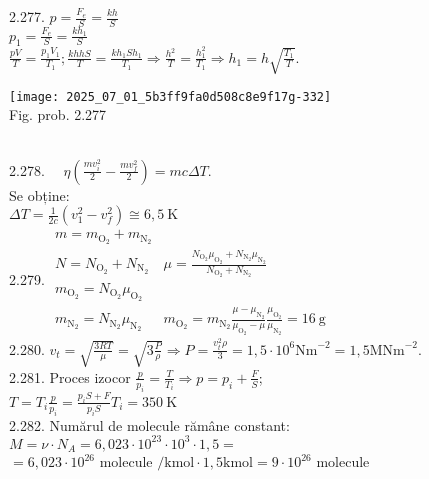 2.277. $p=\frac{F_{e}}{S}=\frac{k h}{S}$\\ $p_{1}=\frac{F_{e}}{S}=\frac{k h_{1}}{S}$\\ $\frac{p V}{T}=\frac{p_{1} V_{1}}{T_{1}} ; \frac{k h h S}{T}=\frac{k h_{1} S h_{1}}{T_{1}} \Rightarrow \frac{h^{2}}{T}=\frac{h_{1}^{2}}{T_{1}} \Rightarrow h_{1}=h \sqrt{\frac{T_{1}}{T}} .$\\ \begin{center} \texttt{[image: 2025\_07\_01\_5b3ff9fa0d508c8e9f17g-332]}\\ Fig. prob. 2.277 \end{center}\\

2.278. $\quad \eta\left(\frac{m v_{i}^{2}}{2}-\frac{m v_{f}^{2}}{2}\right)=m c \Delta T$.\\ Se obține:\\ $\Delta T=\frac{1}{2 c}\left(v_{1}^{2}-v_{f}^{2}\right) \cong 6,5 \mathrm{~K}$\\

2.279. $\begin{array}{ll} m=m_{\mathrm{O}_{2}}+m_{\mathrm{N}_{2}}\\ N=N_{\mathrm{O}_{2}}+N_{\mathrm{N}_{2}} & \mu=\frac{N_{\mathrm{O}_{2}} \mu_{\mathrm{O}_{2}}+N_{\mathrm{N}_{2}} \mu_{\mathrm{N}_{2}}}{N_{\mathrm{O}_{2}}+N_{\mathrm{N}_{2}}} \\ m_{\mathrm{O}_{2}}=N_{\mathrm{O}_{2}} \mu_{\mathrm{O}_{2}}\\ m_{\mathrm{N}_{2}}=N_{\mathrm{N}_{2}} \mu_{\mathrm{N}_{2}} & m_{\mathrm{O}_{2}}=m_{\mathrm{N}_{2}} \frac{\mu-\mu_{\mathrm{N}_{2}}}{\mu_{\mathrm{O}_{2}}-\mu} \frac{\mu_{\mathrm{O}_{2}}}{\mu_{\mathrm{N}_{2}}}=16 \mathrm{~g} \end{array}$\\

2.280. $v_{t}=\sqrt{\frac{3 R T}{\mu}}=\sqrt{3 \frac{P}{\rho}} \Rightarrow P=\frac{v_{t}^{2} \rho}{3}=1,5 \cdot 10^{6} \mathrm{Nm}^{-2}=1,5 \mathrm{MNm}^{-2}$.\\

2.281. Proces izocor $\frac{p}{p_{i}}=\frac{T}{T_{i}} \Rightarrow p=p_{i}+\frac{F}{S}$;\\ $T=T_{i} \frac{p}{p_{i}}=\frac{p_{i} S+F}{p_{i} S} T_{i}=350 \mathrm{~K}$\\

2.282. Numărul de molecule rămâne constant:\\ $M=\nu \cdot N_{A}=6,023 \cdot 10^{23} \cdot 10^{3} \cdot 1,5=$\\ $=6,023 \cdot 10^{26} \text { molecule } / \mathrm{kmol} \cdot 1,5 \mathrm{kmol}=9 \cdot 10^{26}$ molecule\\


